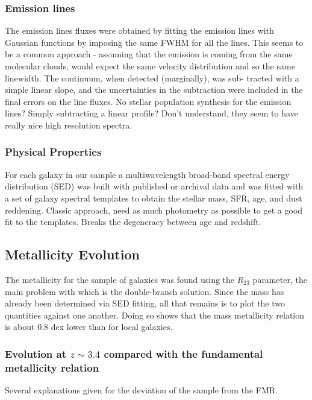 \documentclass{literature}
\begin{document}
\subsubsection{Emission lines}
The emission lines fluxes were obtained by fitting the emission lines with Gaussian functions by imposing the same FWHM for all the lines. This seems to be a common approach - assuming that the emission is coming from the same molecular clouds, would expect the same velocity distribution and so the same linewidth. The continuum, when detected (marginally), was sub- tracted with a simple linear slope, and the uncertainties in the subtraction were included in the final errors on the line fluxes. No stellar population synthesis for the emission lines? Simply subtracting a linear profile? Don't understand, they seem to have really nice high resolution spectra. 
\subsubsection{Physical Properties}
For each galaxy in our sample a multiwavelength broad-band spectral energy distribution (SED) was built with published or archival data and was fitted with a set of galaxy spectral templates to obtain the stellar mass, SFR, age, and dust reddening. Classic approach, need as much photometry as possible to get a good fit to the templates. Breaks the degeneracy between age and redshift. 

\subsection{Metallicity Evolution}
The metallicity for the sample of galaxies was found using the $R_{23}$ parameter, the main problem with which is the double-branch solution. Since the mass has already been determined via SED fitting, all that remains is to plot the two quantities against one another. Doing so shows that the mass metallicity relation is about 0.8 dex lower than for local galaxies. 

\subsubsection{Evolution at $z∼3.4$ compared with the fundamental metallicity relation}
Several explanations given for the deviation of the sample from the FMR.
\end{document}
